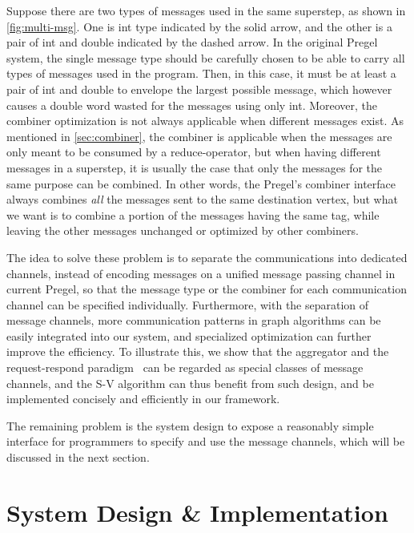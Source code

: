 \documentclass{sokendai_thesis} %
\begin{document}
Suppose there are two types of messages used in the same superstep, as shown in \autoref{fig:multi-msg}.
One is int type indicated by the solid arrow, and the other is a pair of int and double indicated by the dashed arrow.
In the original Pregel system, the single message type should be carefully chosen to be able to carry all types of messages used in the program.
Then, in this case, it must be at least a pair of int and double to envelope the largest possible message, which however causes a double word wasted for the messages using only int.
Moreover, the combiner optimization is not always applicable when different messages exist.
As mentioned in \autoref{sec:combiner}, the combiner is applicable when the messages are only meant to be consumed by a reduce-operator,
but when having different messages in a superstep, it is usually the case that only the messages for the same purpose can be combined.
In other words, the Pregel's combiner interface always combines \emph{all} the messages sent to the same destination vertex, but what we want is to combine a portion of the messages having the same tag, while leaving the other messages unchanged or optimized by other combiners.

The idea to solve these problem is to separate the communications into dedicated channels, instead of encoding messages on a unified message passing channel in current Pregel, so that the message type or the combiner for each communication channel can be specified individually.
Furthermore, with the separation of message channels, more communication patterns in graph algorithms can be easily integrated into our system, and specialized optimization can further improve the efficiency.
To illustrate this, we show that the aggregator and the request-respond paradigm~\cite{effective} can be regarded as special classes of message channels, and the S-V algorithm can thus benefit from such design, and be implemented concisely and efficiently in our framework.

The remaining problem is the system design to expose a reasonably simple interface for programmers to specify and use the message channels, which will be discussed in the next section.

\section{System Design \& Implementation}
\end{document}
